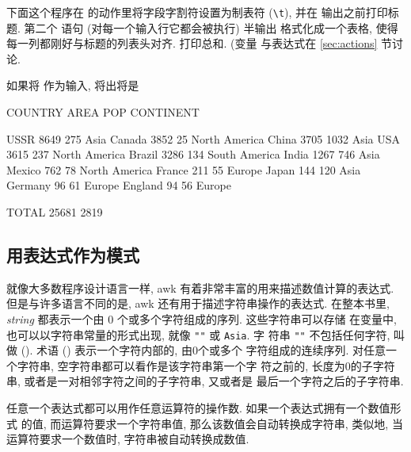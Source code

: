 下面这个程序在 \BEGIN 的动作里将字段字割符设置为制表符 (\verb'\t'), 并在
输出之前打印标题. 第二个 \printf 语句 (对每一个输入行它都会被执行) 半输出
格式化成一个表格, 使得每一列都刚好与标题的列表头对齐. \END 打印总和. (变量
与表达式在 \ref{sec:actions} 节讨论.
如果将  作为输入, 将出将是
\begin{file}
   COUNTRY   AREA   POP   CONTINENT

      USSR   8649   275   Asia
    Canada   3852    25   North America
     China   3705  1032   Asia
       USA   3615   237   North America
    Brazil   3286   134   South America
     India   1267   746   Asia
    Mexico    762    78   North America
    France    211    55   Europe
     Japan    144   120   Asia
   Germany     96    61   Europe
   England     94    56   Europe

     TOTAL  25681  2819
\end{file}

\subsection{用表达式作为模式}
\label{subsec:expressions_as_patterns}

就像大多数程序设计语言一样, awk 有着非常丰富的用来描述数值计算的表达式.
但是与许多语言不同的是, awk 还有用于描述字符串操作的表达式. 在整本书里,
\textit{string} 都表示一个由 0 个或多个字符组成的序列. 这些字符串可以存储
在变量中, 也可以以字符串常量的形式出现, 就像 \verb'""' 或 \verb'Asia'. 字
符串 \verb'""' 不包括任何字符, 叫做  ().
术语  () 表示一个字符内部的, 由0个或多个
字符组成的连续序列. 对任意一个字符串, 空字符串都可以看作是该字符串第一个字
符之前的, 长度为0的子字符串, 或者是一对相邻字符之间的子字符串, 又或者是
最后一个字符之后的子字符串.

任意一个表达式都可以用作任意运算符的操作数. 如果一个表达式拥有一个数值形式
的值, 而运算符要求一个字符串值, 那么该数值会自动转换成字符串, 类似地, 当
运算符要求一个数值时, 字符串被自动转换成数值.

